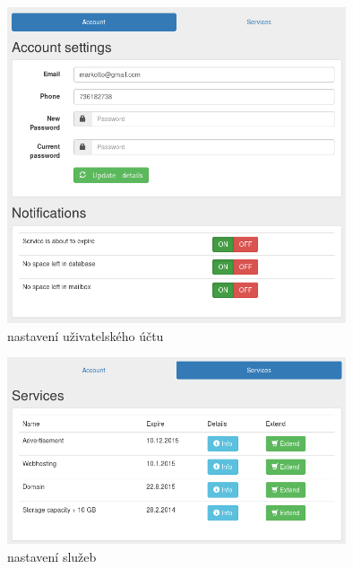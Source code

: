 \documentclass[11pt,a4paper]{article}
\begin{document}
    \begin{figure}[ht]
      \begin{center}
        \includegraphics[width=10cm]{acc}
        \caption{nastavení uživatelského účtu}
      \end{center}
    \end{figure}

    \begin{figure}[ht]
      \begin{center}
        \includegraphics[width=10cm]{srvc}
        \caption{nastavení služeb}
      \end{center}
    \end{figure}
\end{document}
